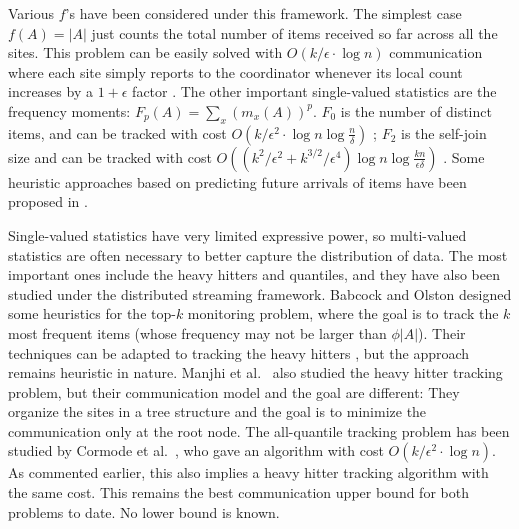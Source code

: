 \documentclass[10pt]{article}
\newcommand{\eps}{\epsilon}
\begin{document}
Various $f$'s have been considered under this framework.  The simplest case
$f(A) = |A|$ just counts the total number of items received so far across
all the sites.  This problem can be easily solved with $O(k/\eps \cdot \log
n)$ communication where each site simply reports to the coordinator
whenever its local count increases by a $1+\eps$ factor
\cite{keralapura06}.  The other important single-valued statistics are the
frequency moments: $F_p(A) = \sum_x (m_x(A))^p$.  $F_0$ is the number of
distinct items, and can be tracked with cost $O(k/\eps^2 \cdot \log n
\log\frac{n}{\delta})$ \cite{graham08}; $F_2$ is the self-join size and can
be tracked with cost $O((k^2/\eps^2 + k^{3/2}/\eps^4) \log n
\log\frac{kn}{\eps\delta})$ \cite{graham08}.  Some heuristic approaches
based on predicting future arrivals of items have been proposed in
\cite{cormode06:what,cormode05:sketch}.

Single-valued statistics have very limited expressive power, so
multi-valued statistics are often necessary to better capture the
distribution of data.  The most important ones include the heavy hitters
and quantiles, and they have also been studied under the distributed
streaming framework.  Babcock and Olston \cite{Babcock:Olston:03} designed
some heuristics for the top-$k$ monitoring problem, where the goal is to
track the $k$ most frequent items (whose frequency may not be larger than
$\phi |A|$).  Their techniques can be adapted to tracking the heavy hitters
\cite{fuller07:_fids}, but the approach remains heuristic in nature.
Manjhi et al.~\cite{manjhi05:_findin} also studied the heavy hitter
tracking problem, but their communication model and the goal are different:
They organize the sites in a tree structure and the goal is to minimize the
communication only at the root node.  The all-quantile tracking problem has
been studied by Cormode et
al.~\cite{Cormode:Garofalakis:Muthukrishnan:Rastogi:05}, who gave an
algorithm with cost $O(k/\eps^2 \cdot \log n)$.  As commented earlier, this
also implies a heavy hitter tracking algorithm with the same cost.  This
remains the best communication upper bound for both problems to date.  No
lower bound is known.
\end{document}
